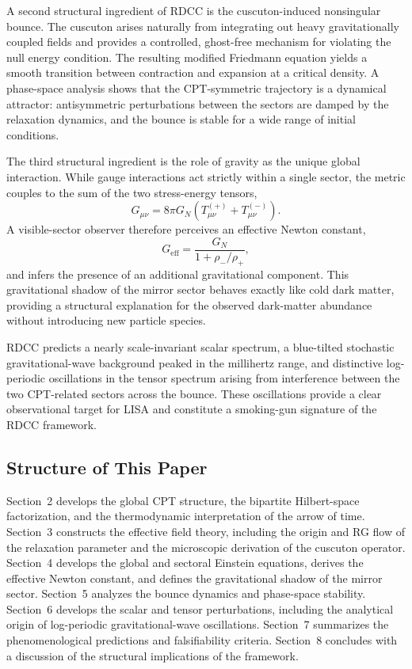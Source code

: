 \documentclass[11pt,a4paper]{article}
\begin{document}
A second structural ingredient of RDCC is the cuscuton-induced nonsingular bounce. The
cuscuton arises naturally from integrating out heavy gravitationally coupled fields and provides a
controlled, ghost-free mechanism for violating the null energy condition. The resulting modified
Friedmann equation yields a smooth transition between contraction and expansion at a critical
density. A phase-space analysis shows that the CPT-symmetric trajectory is a dynamical
attractor: antisymmetric perturbations between the sectors are damped by the relaxation
dynamics, and the bounce is stable for a wide range of initial conditions.

The third structural ingredient is the role of gravity as the unique global interaction. While
gauge interactions act strictly within a single sector, the metric couples to the sum of the two
stress-energy tensors,
\begin{equation}
    G_{\mu\nu} = 8\pi G_{N}\left(T^{(+)}_{\mu\nu} + T^{(-)}_{\mu\nu}\right).
\end{equation}
A visible-sector observer therefore perceives an effective Newton constant,
\begin{equation}
    G_{\mathrm{eff}} = \frac{G_{N}}{1 + \rho_{-}/\rho_{+}},
\end{equation}
and infers the presence of an additional gravitational component. This gravitational shadow of
the mirror sector behaves exactly like cold dark matter, providing a structural explanation for the
observed dark-matter abundance without introducing new particle species.

RDCC predicts a nearly scale-invariant scalar spectrum, a blue-tilted stochastic
gravitational-wave background peaked in the millihertz range, and distinctive log-periodic
oscillations in the tensor spectrum arising from interference between the two CPT-related sectors
across the bounce. These oscillations provide a clear observational target for LISA and constitute
a smoking-gun signature of the RDCC framework.

\subsection*{Structure of This Paper}

Section~2 develops the global CPT structure, the bipartite Hilbert-space factorization, and the
thermodynamic interpretation of the arrow of time. Section~3 constructs the effective field
theory, including the origin and RG flow of the relaxation parameter and the microscopic
derivation of the cuscuton operator. Section~4 develops the global and sectoral Einstein
equations, derives the effective Newton constant, and defines the gravitational shadow of the
mirror sector. Section~5 analyzes the bounce dynamics and phase-space stability. Section~6
develops the scalar and tensor perturbations, including the analytical origin of log-periodic
gravitational-wave oscillations. Section~7 summarizes the phenomenological predictions and
falsifiability criteria. Section~8 concludes with a discussion of the structural implications of the
framework.
\end{document}
